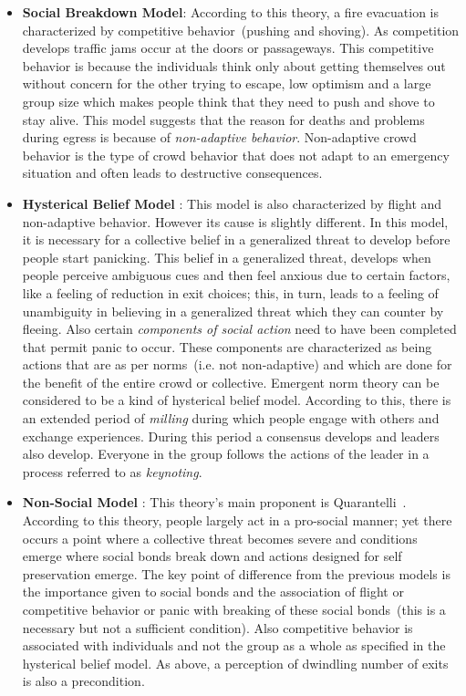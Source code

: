 \begin{itemize}
\item {\bf Social Breakdown Model}: According to this theory, a fire evacuation is characterized by competitive behavior~(pushing and shoving). As competition develops traffic jams occur at the doors or passageways. This competitive behavior is because the individuals think only about getting themselves out without concern for the other trying to escape, low optimism and a large group size which makes people think that they need to push and shove to stay alive. This model suggests that the reason for deaths and problems during egress is because of \emph{non-adaptive behavior}. Non-adaptive crowd behavior is the type of crowd behavior that does not adapt to an emergency situation and often leads to destructive consequences.

\item {\bf Hysterical Belief Model }: This model is also characterized by flight and non-adaptive behavior. However its cause is slightly different. In this model, it is necessary for a collective belief in a generalized threat to develop before people start panicking. This belief in a generalized threat, develops when people perceive ambiguous cues and then feel anxious due to certain factors, like a feeling of reduction in exit choices; this, in turn, leads to a feeling of unambiguity in believing in a generalized threat which they can counter by fleeing. Also certain \emph{components of social action} need to have been completed that permit panic to occur. These components are characterized as being actions that are as per norms~(i.e. not non-adaptive) and which are done for the benefit of the entire crowd or collective. Emergent norm theory can be considered to be a kind of hysterical belief model. According to this, there is an extended period of \emph{milling} during which people engage with others and exchange experiences. During this period a consensus develops and leaders also develop. Everyone in the group follows the actions of the leader in a process referred to as \emph{keynoting}.

\item {\bf Non-Social Model }: This theory's main proponent is Quarantelli~\cite{Quarantelli:1954vr}. According to this theory, people largely act in a pro-social manner; yet there occurs a point where a collective threat becomes severe and conditions emerge where social bonds break down and actions designed for self preservation emerge. The key point of difference from the previous models is the importance given to social bonds and the association of flight or competitive behavior or panic with breaking of these social bonds~(this is a necessary but not a sufficient condition). Also competitive behavior is associated with individuals and not the group as a whole as specified in the hysterical belief model. As above, a perception of dwindling number of exits is also a precondition.


\end{itemize}

